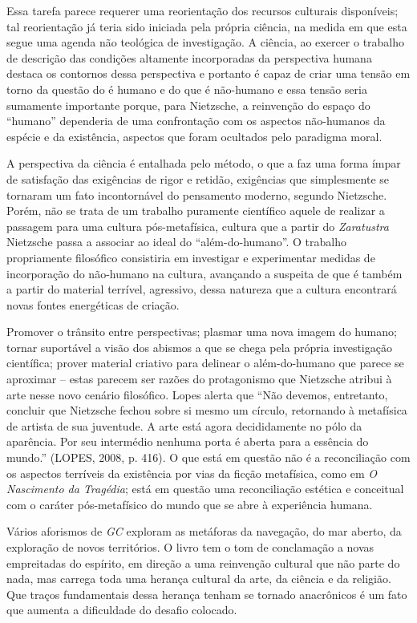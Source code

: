 \documentclass[
	12pt,				%
	openright,			%
	oneside,			%
	a4paper,			%
	english,			%
	french,				%
	spanish,			%
	brazil				%
	]{abntex2}
\begin{document}
Essa tarefa parece requerer uma reorientação dos recursos culturais disponíveis; tal reorientação já teria sido iniciada pela própria ciência, na medida em que esta segue uma agenda não teológica de investigação. A ciência, ao exercer o trabalho de descrição das condições altamente incorporadas da perspectiva humana destaca os contornos dessa perspectiva e portanto é capaz de criar uma tensão em torno da questão do é humano e do que é não-humano e essa tensão seria sumamente importante porque, para Nietzsche, a reinvenção do espaço do “humano” dependeria de uma confrontação com os aspectos não-humanos da espécie e da existência, aspectos que foram ocultados pelo paradigma moral. 

A perspectiva da ciência é entalhada pelo método, o que a faz uma forma ímpar de satisfação das exigências de rigor e retidão, exigências que simplesmente se tornaram um fato incontornável do pensamento moderno, segundo Nietzsche. Porém, não se trata de um trabalho puramente científico aquele de realizar a passagem para uma cultura pós-metafísica, cultura que a partir do \textit{Zaratustra} Nietzsche passa a associar ao ideal do “além-do-humano”. O trabalho propriamente filosófico consistiria em investigar e experimentar medidas de incorporação do não-humano na cultura, avançando a suspeita de que é também a partir do material terrível, agressivo, dessa natureza que a cultura encontrará novas fontes energéticas de criação. 

Promover o trânsito entre perspectivas; plasmar uma nova imagem do humano; tornar suportável a visão dos abismos a que se chega pela própria investigação científica; prover material criativo para delinear o além-do-humano que parece se aproximar – estas parecem ser razões do protagonismo que Nietzsche atribui à arte nesse novo cenário filosófico. Lopes alerta que “Não devemos, entretanto, concluir que Nietzsche fechou sobre si mesmo um círculo, retornando à metafísica de artista de sua juventude. A arte está agora decididamente no pólo da aparência. Por seu intermédio nenhuma porta é aberta para a essência do mundo.” (LOPES, 2008, p. 416). O que está em questão não é a reconciliação com os aspectos terríveis da existência por vias da ficção metafísica, como em \textit{O Nascimento da Tragédia}; está em questão uma reconciliação estética e conceitual com o caráter pós-metafísico do mundo que se abre à experiência humana.

Vários aforismos de \textit{GC} exploram as metáforas da navegação, do mar aberto, da exploração de novos territórios. O livro tem o tom de conclamação a novas empreitadas do espírito, em direção a uma reinvenção cultural que não parte do nada, mas carrega toda uma herança cultural da arte, da ciência e da religião. Que traços fundamentais dessa herança tenham se tornado anacrônicos é um fato que aumenta a dificuldade do desafio colocado. 
\end{document}
